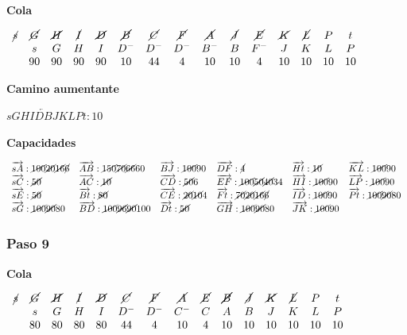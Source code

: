 \documentclass[10pt,a4paper]{article}
\begin{document}
\textbf{Cola}

$\begin{array}{ccccccccccccccc} \cancel{s} & \cancel{G} & \cancel{H} & \cancel{I} & \cancel{D} & \cancel{B} &\cancel{C} & \cancel{F} &\cancel{A} & \cancel{J} &\cancel{E} & \cancel{K}& \cancel{L} &P & t\\ &s & G &H & I & D^- &D^- & D^- & B^- &B & F^-&J & K & L& P\\ & 90 & 90& 90 & 90 & 10 & 44 & 4&10 &10 & 4 & 10 & 10 & 10 & 10 \end{array}$

\textbf{Camino aumentante}

\textbf{$sGHI\overleftarrow{DB}JKLPt:10$}

\textbf{Capacidades}

$\begin{array}{llllll} \overrightarrow{sA}: \cancel{100}\cancel{20}\cancel{16}\cancel{6}& \overrightarrow{AB}: \cancel{150} \cancel{70}\cancel{66}60&\overrightarrow{BJ}: \cancel{100}90& \overrightarrow{DF}: \cancel{4}&\overrightarrow{Ht}: \cancel{10}&\overrightarrow{KL}: \cancel{100}90\\ \overrightarrow{sC}: \cancel{50}& \overrightarrow{AC}: \cancel{10}&\overrightarrow{CD}: \cancel{50}6&\overrightarrow{EF}: \cancel{100}\cancel{50}\cancel{40}34&\overrightarrow{HI}: \cancel{100}90&\overrightarrow{LP}: \cancel{100}90\\ \overrightarrow{sE}: \cancel{50}& \overrightarrow{Bt}: \cancel{80}&\overrightarrow{CE}: \cancel{20}\cancel{10}4 &\overrightarrow{Ft}: \cancel{70}\cancel{20}\cancel{16}\cancel{6}&\overrightarrow{ID}: \cancel{100}90&\overrightarrow{Pt}: \cancel{100}\cancel{90}80\\ \overrightarrow{sG}: \cancel{100}\cancel{90}80& \overrightarrow{BD}: \cancel{100}\cancel{96}\cancel{90}100&\overrightarrow{Dt}: \cancel{50}&\overrightarrow{GH}: \cancel{100}\cancel{90}80&\overrightarrow{JK}: \cancel{100}90&\\ \end{array}$

\subsubsection*{Paso 9}

\textbf{Cola}

\textbf{$\begin{array}{ccccccccccccccc} \cancel{s} & \cancel{G} & \cancel{H} & \cancel{I} & \cancel{D}& \cancel{C } &\cancel{F} & \cancel{A} & \cancel{E} & \cancel{B} & \cancel{J} & \cancel{K} & \cancel{L} &P & t\\ & s & G & H & I & D^- &D^-& C^- & C &A & B &J &K &L &P\\ & 80 & 80 & 80 & 80 & 44& 4 & 10 & 4 & 10 & 10& 10 & 10 & 10 & 10 \end{array}$}
\end{document}
